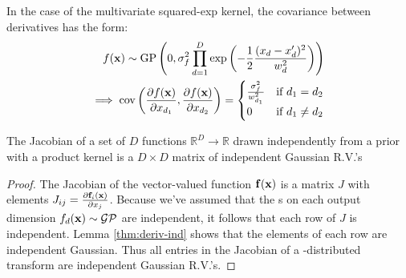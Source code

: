 \documentclass[twoside]{article}
\makeatletter
\newlength{\nonHumbleHeight}
\def\@humbleformat#1{{\settoheight{\nonHumbleHeight}{#1}\resizebox{!}{0.94\nonHumbleHeight}{#1}}}%
\newcommand\humble[1]{{\@humbleformat{#1}}}%
\newcommand{\gp}{{\humble{GP}}}
\newcommand{\lengthscale}{w}
\newcommand{\layerindex}{\ell}
\makeatother
\begin{document}
In the case of the multivariate squared-exp kernel, the covariance between derivatives has the form:
%
\begin{align}
f(\vx) \sim \textnormal{GP}\left( 0, 
\sigma^2_f \prod_{d=1}^D \exp \left(-\frac{1}{2} \frac{(x_d - x_d')^2}{\lengthscale_d^2} \right) \right) \nonumber \\
 \implies 
\cov \left( \frac{\partial f(\vx)}{\partial x_{d_1}}, \frac{\partial f(\vx)}{\partial x_{d_2}} \right) =
\begin{cases} 
\frac{\sigma^2_f}{\lengthscale_{d_1}^2} & \mbox{if } d_1 = d_2 \\ 
0 & \mbox{if } d_1 \neq d_2 \end{cases}
\end{align}


\begin{lemma}
\label{thm:matrix}
The Jacobian of a set of $D$ functions $\mathbb{R}^D \rightarrow \mathbb{R}$ drawn independently from a \gp{} prior with a product kernel is a $D \times D$ matrix of independent Gaussian R.V.'s
\end{lemma}
%
\vspace{-0.2in}
\begin{proof}
The Jacobian of the vector-valued function ${\bf{f}}({\bf{x}})$ is a matrix $J$ with elements ${J_{ij} = \frac{ \partial {\bf{f}}_i ({\bf{x}}) }{\partial x_j}}$.
%
%
%
Because we've assumed that the \gp{}s on each output dimension $f_d({\bf{x}}) \sim \mathcal{GP}$ are independent, it follows that each row of $J$ is independent.
Lemma \ref{thm:deriv-ind} shows that the elements of each row are independent Gaussian.
Thus all entries in the Jacobian of a \gp{}-distributed transform are independent Gaussian R.V.'s.
\end{proof}
\end{document}
